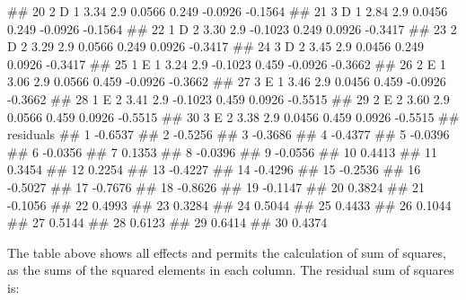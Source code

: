 \documentclass[a4paper,12pt,oneside]{book}
\newenvironment{Shaded}{\begin{snugshade}}{\end{snugshade}}
\newcommand{\DocumentationTok}[1]{#1}
\begin{document}
\begin{Shaded}
\begin{Highlighting}[]
\DocumentationTok{\#\# 20     2        D 1  3.34 2.9  0.0566  0.249 {-}0.0926   {-}0.1564}
\DocumentationTok{\#\# 21     3        D 1  2.84 2.9  0.0456  0.249 {-}0.0926   {-}0.1564}
\DocumentationTok{\#\# 22     1        D 2  3.30 2.9 {-}0.1023  0.249  0.0926   {-}0.3417}
\DocumentationTok{\#\# 23     2        D 2  3.29 2.9  0.0566  0.249  0.0926   {-}0.3417}
\DocumentationTok{\#\# 24     3        D 2  3.45 2.9  0.0456  0.249  0.0926   {-}0.3417}
\DocumentationTok{\#\# 25     1        E 1  3.24 2.9 {-}0.1023  0.459 {-}0.0926   {-}0.3662}
\DocumentationTok{\#\# 26     2        E 1  3.06 2.9  0.0566  0.459 {-}0.0926   {-}0.3662}
\DocumentationTok{\#\# 27     3        E 1  3.46 2.9  0.0456  0.459 {-}0.0926   {-}0.3662}
\DocumentationTok{\#\# 28     1        E 2  3.41 2.9 {-}0.1023  0.459  0.0926   {-}0.5515}
\DocumentationTok{\#\# 29     2        E 2  3.60 2.9  0.0566  0.459  0.0926   {-}0.5515}
\DocumentationTok{\#\# 30     3        E 2  3.38 2.9  0.0456  0.459  0.0926   {-}0.5515}
\DocumentationTok{\#\#    residuals}
\DocumentationTok{\#\# 1    {-}0.6537}
\DocumentationTok{\#\# 2    {-}0.5256}
\DocumentationTok{\#\# 3    {-}0.3686}
\DocumentationTok{\#\# 4    {-}0.4377}
\DocumentationTok{\#\# 5    {-}0.0396}
\DocumentationTok{\#\# 6    {-}0.0356}
\DocumentationTok{\#\# 7     0.1353}
\DocumentationTok{\#\# 8    {-}0.0396}
\DocumentationTok{\#\# 9    {-}0.0556}
\DocumentationTok{\#\# 10    0.4413}
\DocumentationTok{\#\# 11    0.3454}
\DocumentationTok{\#\# 12    0.2254}
\DocumentationTok{\#\# 13   {-}0.4227}
\DocumentationTok{\#\# 14   {-}0.4296}
\DocumentationTok{\#\# 15   {-}0.2536}
\DocumentationTok{\#\# 16   {-}0.5027}
\DocumentationTok{\#\# 17   {-}0.7676}
\DocumentationTok{\#\# 18   {-}0.8626}
\DocumentationTok{\#\# 19   {-}0.1147}
\DocumentationTok{\#\# 20    0.3824}
\DocumentationTok{\#\# 21   {-}0.1056}
\DocumentationTok{\#\# 22    0.4993}
\DocumentationTok{\#\# 23    0.3284}
\DocumentationTok{\#\# 24    0.5044}
\DocumentationTok{\#\# 25    0.4433}
\DocumentationTok{\#\# 26    0.1044}
\DocumentationTok{\#\# 27    0.5144}
\DocumentationTok{\#\# 28    0.6123}
\DocumentationTok{\#\# 29    0.6414}
\DocumentationTok{\#\# 30    0.4374}
\end{Highlighting}
\end{Shaded}

\normalsize

The table above shows all effects and permits the calculation of sum of squares, as the sums of the squared elements in each column. The residual sum of squares is:

\vspace{12pt}
\end{document}
